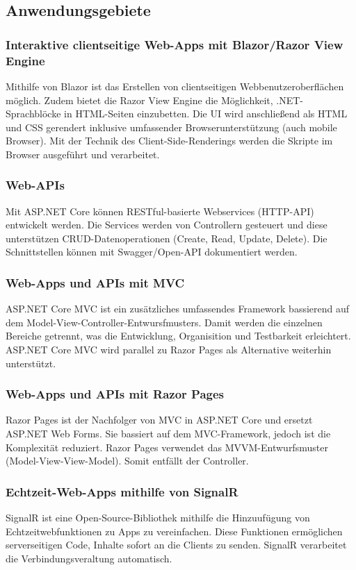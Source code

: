 \subsection{Anwendungsgebiete}

\subsubsection{Interaktive clientseitige Web-Apps mit Blazor/Razor View Engine}
Mithilfe von Blazor ist das Erstellen von clientseitigen Webbenutzeroberflächen möglich.
Zudem bietet die Razor View Engine die Möglichkeit, .NET-Sprachblöcke in HTML-Seiten einzubetten.
Die UI wird anschließend als HTML und CSS gerendert inklusive umfassender Browserunterstützung (auch mobile Browser).
Mit der Technik des Client-Side-Renderings werden die Skripte im Browser ausgeführt und verarbeitet.

\subsubsection{Web-APIs}
Mit ASP.NET Core können RESTful-basierte Webservices (HTTP-API) entwickelt werden. Die Services werden von Controllern gesteuert und diese 
unterstützen CRUD-Datenoperationen (Create, Read, Update, Delete).
Die Schnittstellen können mit Swagger/Open-API dokumentiert werden.

\subsubsection{Web-Apps und APIs mit MVC}
ASP.NET Core MVC ist ein zusätzliches umfassendes Framework bassierend auf dem Model-View-Controller-Entwursfmusters. Damit werden 
die einzelnen Bereiche getrennt, was die Entwicklung, Organisition und Testbarkeit erleichtert. 
ASP.NET Core MVC wird parallel zu Razor Pages als Alternative weiterhin unterstützt.

\subsubsection{Web-Apps und APIs mit Razor Pages}
Razor Pages ist der Nachfolger von MVC in ASP.NET Core und ersetzt ASP.NET Web Forms. 
Sie bassiert auf dem MVC-Framework, jedoch ist die Komplexität reduziert. Razor Pages verwendet das 
MVVM-Entwurfsmuster (Model-View-View-Model). Somit entfällt der Controller.


\subsubsection{Echtzeit-Web-Apps mithilfe von SignalR}
SignalR ist eine Open-Source-Bibliothek mithilfe die Hinzuufügung von Echtzeitwebfunktionen zu Apps zu vereinfachen.
Diese Funktionen ermöglichen serverseitigen Code, Inhalte sofort an die Clients zu senden. SignalR verarbeitet die Verbindungsveraltung 
automatisch.

